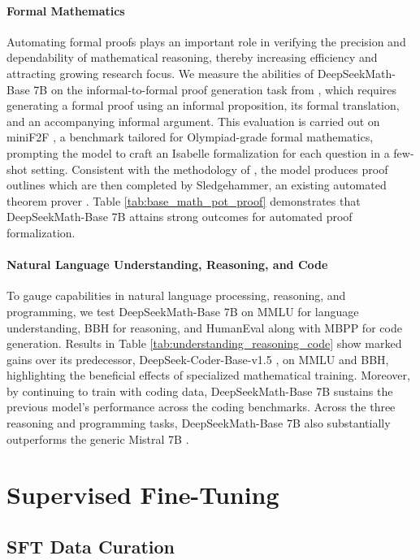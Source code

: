 \paragraph{Formal Mathematics}

Automating formal proofs plays an important role in verifying the precision and dependability of mathematical reasoning, thereby increasing efficiency and attracting growing research focus. We measure the abilities of DeepSeekMath-Base 7B on the informal-to-formal proof generation task from \citep{dsp_proof}, which requires generating a formal proof using an informal proposition, its formal translation, and an accompanying informal argument. This evaluation is carried out on miniF2F \citep{minif2f}, a benchmark tailored for Olympiad-grade formal mathematics, prompting the model to craft an Isabelle formalization for each question in a few-shot setting. Consistent with the methodology of \cite{dsp_proof}, the model produces proof outlines which are then completed by Sledgehammer, an existing automated theorem prover \citep{sledgehammer}. Table \ref{tab:base_math_pot_proof} demonstrates that DeepSeekMath-Base 7B attains strong outcomes for automated proof formalization.

\paragraph{Natural Language Understanding, Reasoning, and Code}

To gauge capabilities in natural language processing, reasoning, and programming, we test DeepSeekMath-Base 7B on MMLU \citep{mmlu} for language understanding, BBH \citep{bbh} for reasoning, and HumanEval \citep{codex} along with MBPP \citep{mbpp} for code generation. Results in Table \ref{tab:understanding_reasoning_code} show marked gains over its predecessor, DeepSeek-Coder-Base-v1.5 \citep{deepseek-coder}, on MMLU and BBH, highlighting the beneficial effects of specialized mathematical training. Moreover, by continuing to train with coding data, DeepSeekMath-Base 7B sustains the previous model's performance across the coding benchmarks. Across the three reasoning and programming tasks, DeepSeekMath-Base 7B also substantially outperforms the generic Mistral 7B \citep{mistral}.

\section{Supervised Fine-Tuning}

\subsection{SFT Data Curation}

